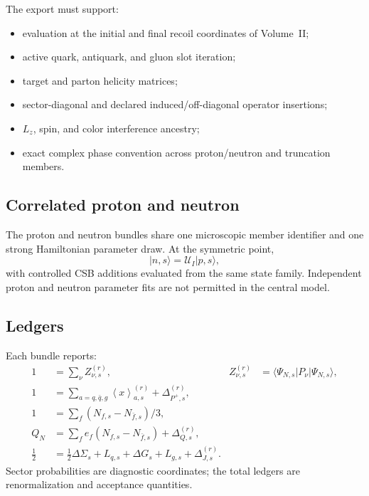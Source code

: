 \documentclass[11pt]{article}
\newcommand{\cU}{\mathcal U}
\newcommand{\avg}[1]{\left\langle #1\right\rangle}
\newcommand{\Lz}{L_z}
\begin{document}
The export must support:
\begin{itemize}
 \item evaluation at the initial and final recoil coordinates of Volume~II;
 \item active quark, antiquark, and gluon slot iteration;
 \item target and parton helicity matrices;
 \item sector-diagonal and declared induced/off-diagonal operator insertions;
 \item \(\Lz\), spin, and color interference ancestry;
 \item exact complex phase convention across proton/neutron and truncation
 members.
\end{itemize}

\subsection{Correlated proton and neutron}

The proton and neutron bundles share one microscopic member identifier and one
strong Hamiltonian parameter draw.  At the symmetric point,
\begin{equation}
 |n,s\rangle=\cU_I|p,s\rangle,
 \label{eq:isospin-bundle}
\end{equation}
with controlled CSB additions evaluated from the same state family.  Independent
proton and neutron parameter fits are not permitted in the central model.

\subsection{Ledgers}

Each bundle reports:
\begin{align}
 1&=\sum_{\nu}Z_{\nu,s}^{(r)},
 &Z_{\nu,s}^{(r)}&=\langle\Psi_{N,s}|P_\nu|\Psi_{N,s}\rangle,
 \label{eq:sector-ledger}\\
 1&=\sum_{a=q,\bar q,g}\avg{x}_{a,s}^{(r)}+\Delta_{P^+,s}^{(r)},
 \label{eq:momentum-ledger}\\
 1&=\sum_f\left(N_{f,s}-N_{\bar f,s}\right)/3,
 \label{eq:baryon-ledger}\\
 Q_N&=\sum_f e_f\left(N_{f,s}-N_{\bar f,s}\right)
 +\Delta_{Q,s}^{(r)},
 \label{eq:charge-ledger}\\
 \frac12&=\frac12\Delta\Sigma_s+L_{q,s}+\Delta G_s+L_{g,s}
 +\Delta_{J,s}^{(r)}.
 \label{eq:angular-ledger}
\end{align}
Sector probabilities are diagnostic coordinates; the total ledgers are
renormalization and acceptance quantities.
\end{document}
